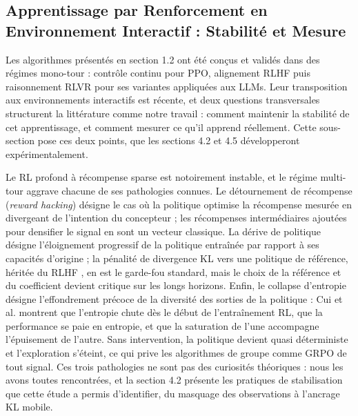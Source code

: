 \documentclass[11pt,a4paper]{article}
\begin{document}
\subsection{Apprentissage par Renforcement en Environnement Interactif : Stabilité et Mesure}

Les algorithmes présentés en section 1.2 ont été conçus et validés dans des régimes mono-tour : contrôle continu pour PPO, alignement RLHF puis raisonnement RLVR pour ses variantes appliquées aux LLMs. Leur transposition aux environnements interactifs est récente, et deux questions transversales structurent la littérature comme notre travail : comment maintenir la stabilité de cet apprentissage, et comment mesurer ce qu'il apprend réellement. Cette sous-section pose ces deux points, que les sections 4.2 et 4.5 développeront expérimentalement.

Le RL profond à récompense sparse est notoirement instable, et le régime multi-tour aggrave chacune de ses pathologies connues. Le détournement de récompense (\emph{reward hacking}) désigne le cas où la politique optimise la récompense mesurée en divergeant de l'intention du concepteur \cite{skalse2022defining} ; les récompenses intermédiaires ajoutées pour densifier le signal en sont un vecteur classique. La dérive de politique désigne l'éloignement progressif de la politique entraînée par rapport à ses capacités d'origine ; la pénalité de divergence KL vers une politique de référence, héritée du RLHF \cite{ouyang2022training}, en est le garde-fou standard, mais le choix de la référence et du coefficient devient critique sur les longs horizons. Enfin, le collapse d'entropie désigne l'effondrement précoce de la diversité des sorties de la politique : Cui et al. \cite{cui2025entropy} montrent que l'entropie chute dès le début de l'entraînement RL, que la performance se paie en entropie, et que la saturation de l'une accompagne l'épuisement de l'autre. Sans intervention, la politique devient quasi déterministe et l'exploration s'éteint, ce qui prive les algorithmes de groupe comme GRPO de tout signal. Ces trois pathologies ne sont pas des curiosités théoriques : nous les avons toutes rencontrées, et la section 4.2 présente les pratiques de stabilisation que cette étude a permis d'identifier, du masquage des observations à l'ancrage KL mobile.
\end{document}
